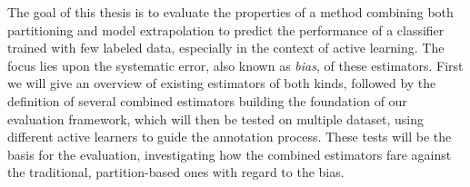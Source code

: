 The goal of this thesis is to evaluate the properties of a method combining both partitioning and model extrapolation to predict the performance of a classifier trained with few labeled data, especially in the context of active learning. The focus lies upon the systematic error, also known as \textit{bias}, of these estimators. First we will give an overview of existing estimators of both kinds, followed by the definition of several combined estimators building the foundation of our evaluation framework, which will then be tested on multiple dataset, using different active learners to guide the annotation process. These tests will be the basis for the evaluation, investigating how the combined estimators fare against the traditional, partition-based ones with regard to the bias.